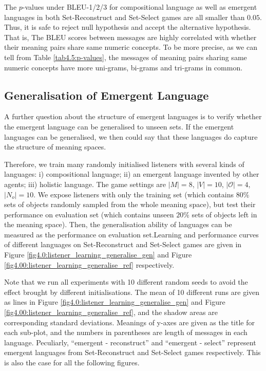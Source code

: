 The $p$-values under BLEU-1/2/3 for compositional language as well as emergent languages in both Set-Reconstruct and Set-Select games are all smaller than $0.05$. Thus, it is safe to reject null hypothesis and accept the alternative hypothesis. That is, The BLEU scores between messages are highly correlated with whether their meaning pairs share same numeric concepts. To be more precise, as we can tell from Table \ref{tab4.5:p-values}, the messages of meaning pairs sharing same numeric concepts have more uni-grams, bi-grams  and tri-grams in common.

\subsection{Generalisation of Emergent Language}
\label{ssec4.2.4:emergent_lan_generalise}

A further question about the structure of emergent languages is to verify whether the emergent language can be generalised to unseen sets. If the emergent languages can be generalised, we then could say that these languages do capture the structure of meaning spaces.

Therefore, we train many randomly initialised listeners with several kinds of languages: i) compositional language; ii) an emergent language invented by other agents; iii) holistic language. The game settings are $|M|=8$, $|V|=10$, $|\mathcal{O}|=4$, $|N_{o}|=10$. We expose listeners with only the training set (which contains $80\%$ sets of objects randomly sampled from the whole meaning space), but test their performance on evaluation set (which contains unseen $20\%$ sets of objects left in the meaning space). Then, the generalisation ability of languages can be measured as the performance on evaluation set.Learning and performance curves of different languages on Set-Reconstruct and Set-Select games are given in Figure \ref{fig4.0:listener_learning_generalise_gen} and Figure \ref{fig4.00:listener_learning_generalise_ref} respectively. 

Note that we run all experiments with 10 different random seeds to avoid the effect brought by different initialisations. The mean of 10 different runs are given as lines in Figure \ref{fig4.0:listener_learning_generalise_gen} and Figure \ref{fig4.00:listener_learning_generalise_ref}, and the shadow areas are corresponding standard deviations. Meanings of y-axes are given as the title for each sub-plot, and the numbers in parentheses are length of messages in each language. Peculiarly, ``emergent - reconstruct'' and ``emergent - select'' represent emergent languages from Set-Reconstruct and Set-Select games respectively. This is also the case for all the following figures.

